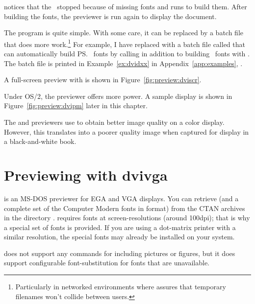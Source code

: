  notices that the \dvidriver\ stopped
because of missing fonts and runs  to build them.  After
building the fonts, the previewer is run again to display
the document.

The  program is quite simple.  With some
care, it can be replaced by a batch file that does
more work.\footnote{Particularly in networked environments where
 assures that temporary filenames won't collide
between users.}  For example, I have replaced  with
a  batch file called  that can
automatically build \ps\ fonts by calling  in
addition to building \MF\ fonts with . 
The  batch file is printed in Example~\ref{ex:dvidxx}
in Appendix~\ref{app:examples}, {\it {}}.

A full-screen preview with  is shown in
Figure~\ref{fig:preview:dviscr}.


Under OS/2, the  previewer offers more power. 
A sample
 display is shown in Figure~\ref{fig:preview:dvipm} later
in this chapter.


The  and  previewers use \textit{}
to obtain better image quality on a color display.  However, this translates 
into a poorer quality image when captured for display in a black-and-white
book.

\section{Previewing with dvivga}

 is 
an MS-DOS previewer for EGA and VGA displays.
You can retrieve  (and a complete set of the Computer Modern
fonts in  format) from the CTAN archives in the directory
.   requires  fonts
at screen-resolutions (around 100dpi); that is why a special set of fonts
is provided.  If you are using a dot-matrix printer with a similar resolution,
the special fonts may already be installed on your system.

 does not support any  commands for including
pictures or figures, but it does support configurable font-substitution for 
fonts that are unavailable.

